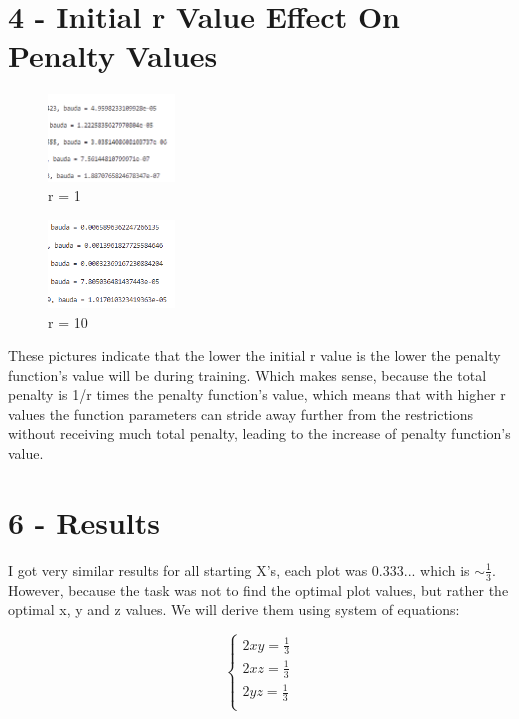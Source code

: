 \documentclass{article}
\begin{document}
\section*{4 - Initial r Value Effect On Penalty Values}
\begin{figure}[H]
    \centering
    \includegraphics[width=0.3\textwidth]{penalty-1.png}
    \caption{r = 1}
    \label{fig:example}
\end{figure}

\begin{figure}[H]
    \centering
    \includegraphics[width=0.3\textwidth]{penalty-10.png}
    \caption{r = 10}
    \label{fig:example}
\end{figure}
These pictures indicate that the lower the initial r value is the lower the penalty function's value will be during training. Which makes sense, because the total penalty is 1/r times the penalty function's value, which means that with higher r values the function parameters can stride away further from the restrictions without receiving much total penalty, leading to the increase of penalty function's value.

\section*{6 - Results}
I got very similar results for all starting X's, each plot was $0.333$... which is $\sim \frac{1}{3}$. However, because the task was not to find the optimal plot values, but rather the optimal x, y and z values. We will derive them using system of equations:

\[
\begin{cases}
2xy = \frac{1}{3} \\
2xz = \frac{1}{3} \\
2yz = \frac{1}{3} \\
\end{cases}
\]
\end{document}
